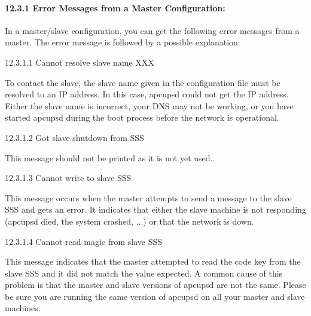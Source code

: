 {{{{{{{{{\label{Error-Messages-from-a-Master-Configuration}

\paragraph*{12.3.1 Error Messages from a Master Configuration:}

In a master/slave configuration, you can get the following error messages from
a master. The error message is followed by a possible explanation: 

\label{Cannot-resolve-slave-name-XXX}

{\small12.3.1.1 Cannot resolve slave name XXX}

To contact the slave, the slave name given in the configuration file must be
resolved to an IP address. In this case, apcupsd could not get the IP address.
Either the slave name is incorrect, your DNS may not be working, or you have
started apcupsd during the boot process before the network is operational. 

\label{Got-slave-shutdown-from-SSS}

{\small12.3.1.2 Got slave shutdown from SSS}

This message should not be printed as it is not yet used. 

\label{Cannot-write-to-slave-SSS}

{\small12.3.1.3 Cannot write to slave SSS}

This message occurs when the master attempts to send a message to the slave
SSS and gets an error. It indicates that either the slave machine is not
responding (apcupsd died, the system crashed, ...) or that the network is
down. 

\label{Cannot-read-magic-from-slave-SSS}

{\small12.3.1.4 Cannot read magic from slave SSS}

This message indicates that the master attempted to read the code key from the
slave SSS and it did not match the value expected. A common cause of this
problem is that the master and slave versions of apcupsd are not the same.
Please be sure you are running the same version of apcupsd on all your master
and slave machines. 

}}}}}}}}}

